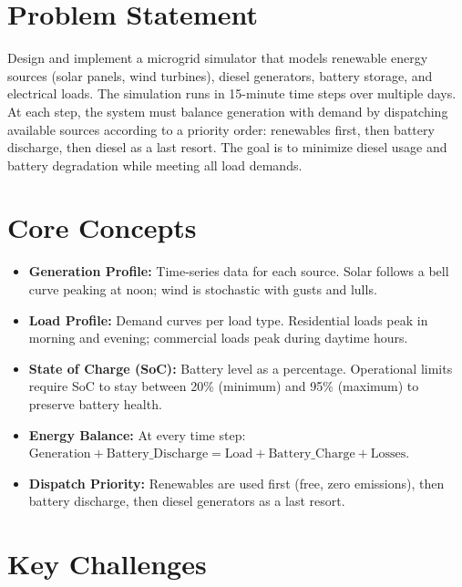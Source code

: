 \section{Problem Statement}

Design and implement a microgrid simulator that models renewable energy sources (solar panels, wind turbines), diesel generators, battery storage, and electrical loads. The simulation runs in 15-minute time steps over multiple days. At each step, the system must balance generation with demand by dispatching available sources according to a priority order: renewables first, then battery discharge, then diesel as a last resort. The goal is to minimize diesel usage and battery degradation while meeting all load demands.

\section{Core Concepts}

\begin{itemize}
  \item \textbf{Generation Profile:} Time-series data for each source. Solar follows a bell curve peaking at noon; wind is stochastic with gusts and lulls.
  \item \textbf{Load Profile:} Demand curves per load type. Residential loads peak in morning and evening; commercial loads peak during daytime hours.
  \item \textbf{State of Charge (SoC):} Battery level as a percentage. Operational limits require SoC to stay between 20\% (minimum) and 95\% (maximum) to preserve battery health.
  \item \textbf{Energy Balance:} At every time step: $\text{Generation} + \text{Battery\_Discharge} = \text{Load} + \text{Battery\_Charge} + \text{Losses}$.
  \item \textbf{Dispatch Priority:} Renewables are used first (free, zero emissions), then battery discharge, then diesel generators as a last resort.
\end{itemize}

\section{Key Challenges}

